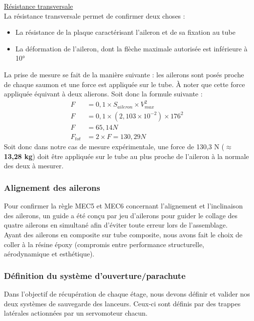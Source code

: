 \underline{Résistance transversale}\\
La résistance transversale permet de confirmer deux choses : 
\begin{itemize}
	\item La résistance de la plaque caractérisant l'aileron et de sa fixation au tube
	\item La déformation de l'aileron, dont la flèche maximale autorisée est inférieure à 10°
\end{itemize}
La prise de mesure se fait de la manière suivante : les ailerons sont posés proche de chaque saumon et une force est appliquée sur le tube. À noter que cette force appliquée équivant à deux alierons. Soit donc la formule suivante :
\begin{align*}
    F &= 0,1 \times S_{aileron} \times V_{max}^2 \\
    F &= 0,1 \times (2,103 \times 10^{-2}) \times 176^2 \\
    F &= 65,14 N\\
    F_{tot} &= 2 \times F = 130,29 N
\end{align*}
Soit donc dans notre cas de mesure expérimentale, une force de 130,3 N (\textbf{$\approx$13,28 kg}) doit être appliquée sur le tube au plus proche de l'aileron à la normale des deux à mesurer.
\subsubsection{Alignement des ailerons}
Pour confirmer la règle MEC5 et MEC6 concernant l'alignement et l'inclinaison des ailerons, un guide a été conçu par jeu d'ailerons pour guider le collage des quatre ailerons en simultané afin d'éviter toute erreur lors de l'assemblage.\\
Ayant des ailerons en composite sur tube composite, nous avons fait le choix de coller à la résine époxy (compromis entre performance structurelle, aérodynamique et esthétique).

\newpage

\subsubsection{Définition du système d'ouverture/parachute}
\label{subsec:defpara}

Dans l'objectif de récupération de chaque étage, nous devons définir et valider nos deux systèmes de sauvegarde des lanceurs.
Ceux-ci sont définis par des trappes latérales actionnées par un servomoteur chacun.\\

